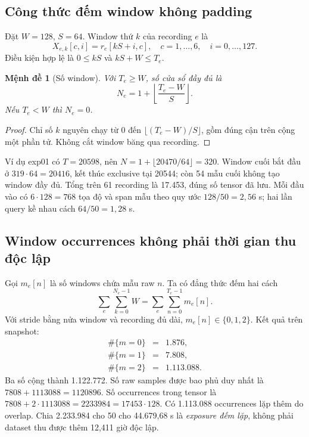 \documentclass[11pt,a4paper]{article}
\newtheorem{proposition}{Mệnh đề}[section]
\theoremstyle{definition}
\begin{document}
\subsection{Công thức đếm window không padding}
Đặt $W=128$, $S=64$. Window thứ $k$ của recording $e$ là
\begin{equation}
X_{e,k}[c,i]=r_e[kS+i,c],\quad c=1,\ldots,6,\quad i=0,\ldots,127.
\end{equation}
Điều kiện hợp lệ là $0\le kS$ và $kS+W\le T_e$.
\begin{proposition}[Số window]
Với $T_e\ge W$, số cửa sổ đầy đủ là
\begin{equation}
N_e=1+\left\lfloor\frac{T_e-W}{S}\right\rfloor.
\end{equation}
Nếu $T_e<W$ thì $N_e=0$.
\end{proposition}
\begin{proof}
Chỉ số $k$ nguyên chạy từ 0 đến $\lfloor(T_e-W)/S\rfloor$, gồm đúng cận
trên cộng một phần tử. Không cắt window băng qua recording.
\end{proof}

Ví dụ exp01 có $T=20598$, nên $N=1+\lfloor20470/64\rfloor=320$.
Window cuối bắt đầu ở $319\cdot64=20416$, kết thúc exclusive tại 20544;
còn 54 mẫu cuối không tạo window đầy đủ. Tổng trên 61 recording là 17.453,
đúng số tensor đã lưu. Mỗi đầu vào có $6\cdot128=768$ tọa độ và span mẫu
theo quy ước $128/50=2,56$ s; hai lần query kề nhau cách $64/50=1,28$ s.

\subsection{Window occurrences không phải thời gian thu độc lập}
Gọi $m_e[n]$ là số windows chứa mẫu raw $n$. Ta có đẳng thức đếm hai cách
\begin{equation}
\sum_e\sum_{k=0}^{N_e-1}W=\sum_e\sum_{n=0}^{T_e-1}m_e[n].
\end{equation}
Với stride bằng nửa window và recording đủ dài, $m_e[n]\in\{0,1,2\}$.
Kết quả trên snapshot:
\begin{equation*}
\begin{array}{rcl}
\#\{m=0\}&=&1.876,\\
\#\{m=1\}&=&7.808,\\
\#\{m=2\}&=&1.113.088.
\end{array}
\end{equation*}
Ba số cộng thành 1.122.772. Số raw samples được bao phủ duy nhất là
$7808+1113088=1120896$. Số occurrences trong tensor là
$7808+2\cdot1113088=2233984=17453\cdot128$. Có 1.113.088 occurrences
lặp thêm do overlap. Chia 2.233.984 cho 50 cho 44.679,68 s là \emph{exposure
đếm lặp}, không phải dataset thu được thêm 12,411 giờ độc lập.
\end{document}
